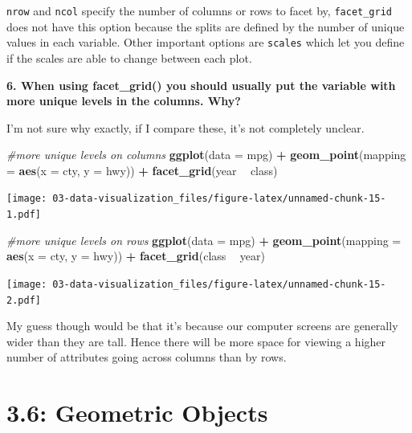 \documentclass[]{book}
\newenvironment{Shaded}{\begin{snugshade}}{\end{snugshade}}
\newcommand{\CommentTok}[1]{\textcolor[rgb]{0.56,0.35,0.01}{\textit{#1}}}
\newcommand{\DataTypeTok}[1]{\textcolor[rgb]{0.13,0.29,0.53}{#1}}
\newcommand{\KeywordTok}[1]{\textcolor[rgb]{0.13,0.29,0.53}{\textbf{#1}}}
\newcommand{\NormalTok}[1]{#1}
\newcommand{\OperatorTok}[1]{\textcolor[rgb]{0.81,0.36,0.00}{\textbf{#1}}}
\newcommand{\StringTok}[1]{\textcolor[rgb]{0.31,0.60,0.02}{#1}}
\theoremstyle{definition}
\theoremstyle{definition}
\theoremstyle{definition}
\theoremstyle{remark}
\begin{document}
\texttt{nrow} and \texttt{ncol} specify the number of columns or rows to
facet by, \texttt{facet\_grid} does not have this option because the
splits are defined by the number of unique values in each variable.
Other important options are \texttt{scales} which let you define if the
scales are able to change between each plot.

\textbf{6. When using facet\_grid() you should usually put the variable
with more unique levels in the columns. Why?}

I'm not sure why exactly, if I compare these, it's not completely
unclear.

\begin{Shaded}
\begin{Highlighting}[]
\CommentTok{#more unique levels on columns}
\KeywordTok{ggplot}\NormalTok{(}\DataTypeTok{data =}\NormalTok{ mpg) }\OperatorTok{+}\StringTok{ }
\StringTok{  }\KeywordTok{geom_point}\NormalTok{(}\DataTypeTok{mapping =} \KeywordTok{aes}\NormalTok{(}\DataTypeTok{x =}\NormalTok{ cty, }\DataTypeTok{y =}\NormalTok{ hwy)) }\OperatorTok{+}\StringTok{ }
\StringTok{  }\KeywordTok{facet_grid}\NormalTok{(year }\OperatorTok{~}\StringTok{ }\NormalTok{class)}
\end{Highlighting}
\end{Shaded}

\texttt{[image: 03-data-visualization\_files/figure-latex/unnamed-chunk-15-1.pdf]}

\begin{Shaded}
\begin{Highlighting}[]
\CommentTok{#more unique levels on rows}
\KeywordTok{ggplot}\NormalTok{(}\DataTypeTok{data =}\NormalTok{ mpg) }\OperatorTok{+}\StringTok{ }
\StringTok{  }\KeywordTok{geom_point}\NormalTok{(}\DataTypeTok{mapping =} \KeywordTok{aes}\NormalTok{(}\DataTypeTok{x =}\NormalTok{ cty, }\DataTypeTok{y =}\NormalTok{ hwy)) }\OperatorTok{+}\StringTok{ }
\StringTok{  }\KeywordTok{facet_grid}\NormalTok{(class }\OperatorTok{~}\StringTok{ }\NormalTok{year)}
\end{Highlighting}
\end{Shaded}

\texttt{[image: 03-data-visualization\_files/figure-latex/unnamed-chunk-15-2.pdf]}

My guess though would be that it's because our computer screens are
generally wider than they are tall. Hence there will be more space for
viewing a higher number of attributes going across columns than by rows.

\hypertarget{geometric-objects}{%
\section{3.6: Geometric Objects}\label{geometric-objects}}
\end{document}
